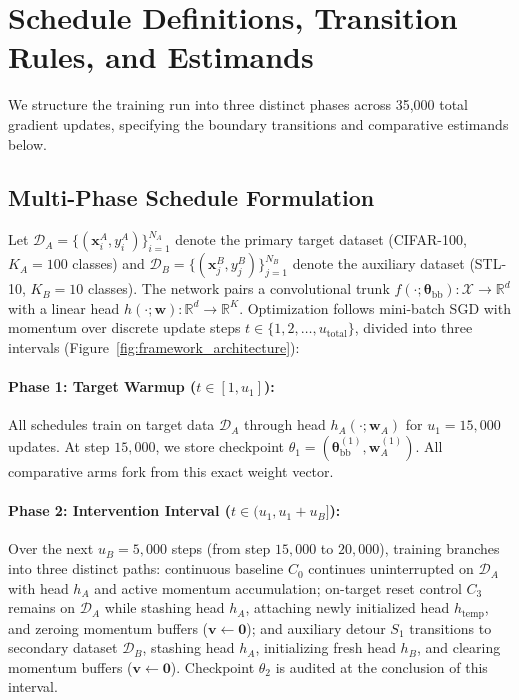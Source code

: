 \documentclass[sn-mathphys,Numbered]{sn-jnl}
\begin{document}
\section{Schedule Definitions, Transition Rules, and Estimands}\label{sec:schedules}

We structure the training run into three distinct phases across 35,000 total gradient updates, specifying the boundary transitions and comparative estimands below.

\subsection{Multi-Phase Schedule Formulation}\label{subsec:schedule_formulation}

Let $\mathcal{D}_A = \{(\bm{x}_i^A, y_i^A)\}_{i=1}^{N_A}$ denote the primary target dataset (CIFAR-100, $K_A = 100$ classes) and $\mathcal{D}_B = \{(\bm{x}_j^B, y_j^B)\}_{j=1}^{N_B}$ denote the auxiliary dataset (STL-10, $K_B = 10$ classes). The network pairs a convolutional trunk $f(\cdot; \bm{\theta}_{\mathrm{bb}}): \mathcal{X} \to \mathbb{R}^d$ with a linear head $h(\cdot; \bm{w}): \mathbb{R}^d \to \mathbb{R}^K$. Optimization follows mini-batch SGD with momentum over discrete update steps $t \in \{1, 2, \dots, u_{\mathrm{total}}\}$, divided into three intervals (Figure~\ref{fig:framework_architecture}):

\paragraph{Phase 1: Target Warmup ($t \in [1, u_1]$):}
All schedules train on target data $\mathcal{D}_A$ through head $h_A(\cdot; \bm{w}_A)$ for $u_1 = 15{,}000$ updates. At step $15{,}000$, we store checkpoint $\theta_1 = (\bm{\theta}_{\mathrm{bb}}^{(1)}, \bm{w}_A^{(1)})$. All comparative arms fork from this exact weight vector.

\paragraph{Phase 2: Intervention Interval ($t \in (u_1, u_1 + u_B]$):}
Over the next $u_B = 5{,}000$ steps (from step $15{,}000$ to $20{,}000$), training branches into three distinct paths: continuous baseline $C_0$ continues uninterrupted on $\mathcal{D}_A$ with head $h_A$ and active momentum accumulation; on-target reset control $C_3$ remains on $\mathcal{D}_A$ while stashing head $h_A$, attaching newly initialized head $h_{\mathrm{temp}}$, and zeroing momentum buffers ($\bm{v} \leftarrow \mathbf{0}$); and auxiliary detour $S_1$ transitions to secondary dataset $\mathcal{D}_B$, stashing head $h_A$, initializing fresh head $h_B$, and clearing momentum buffers ($\bm{v} \leftarrow \mathbf{0}$). Checkpoint $\theta_2$ is audited at the conclusion of this interval.
\end{document}
